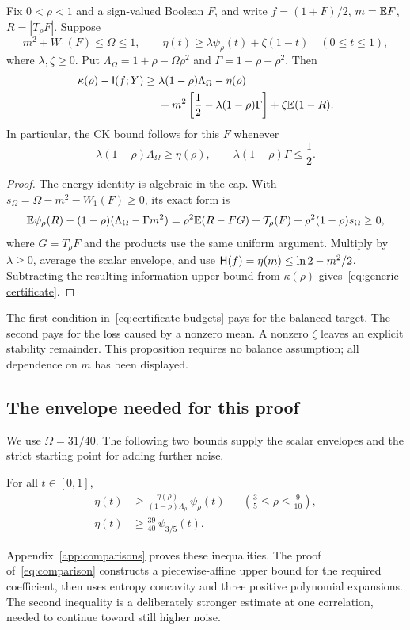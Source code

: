 \begin{proposition}\label{prop:certificate}
Fix $0<\rho<1$ and a sign-valued Boolean $F$, and write $f=(1+F)/2$, $m=\mathbb E F$, $R=|T_\rho F|$. Suppose
\[
 m^2+W_1(F)\le\Omega\le1,
 \qquad \eta(t)\ge\lambda\psi_\rho(t)+\zeta(1-t)
 \quad(0\le t\le1),
\]
where $\lambda,\zeta\ge0$. Put $\Lambda_\Omega=1+\rho-\Omega\rho^2$ and $\Gamma=1+\rho-\rho^2$. Then
\begin{align}\label{eq:generic-certificate}
 \kappa(\rho)-\mathsf I(f;Y)\ge{}&
 \lambda(1-\rho)\Lambda_\Omega-\eta(\rho)\notag\\
 &+m^2\left[\frac12-\lambda(1-\rho)\Gamma\right]
 +\zeta\mathbb E(1-R).
\end{align}
In particular, the CK bound follows for this $F$ whenever
\begin{equation}\label{eq:certificate-budgets}
 \lambda(1-\rho)\Lambda_\Omega\ge\eta(\rho),\qquad
 \lambda(1-\rho)\Gamma\le\frac12.
\end{equation}
\end{proposition}
\begin{proof}
The energy identity is algebraic in the cap. With $s_\Omega=\Omega-m^2-W_1(F)\ge0$, its exact form is
\[
 \mathbb E\psi_\rho(R)-(1-\rho)(\Lambda_\Omega-\Gamma m^2)
 =\rho^2\mathbb E(R-FG)+\mathcal T_\rho(F)+\rho^2(1-\rho)s_\Omega\ge0,
\]
where $G=T_\rho F$ and the products use the same uniform argument. Multiply by $\lambda\ge0$, average the scalar envelope, and use
$\mathsf H(f)=\eta(m)\le\ln2-m^2/2$.
Subtracting the resulting information upper bound from $\kappa(\rho)$ gives~\eqref{eq:generic-certificate}.
\end{proof}

The first condition in~\eqref{eq:certificate-budgets} pays for the balanced target. The second pays for the loss caused by a nonzero mean. A nonzero $\zeta$ leaves an explicit stability remainder. This proposition requires no balance assumption; all dependence on $m$ has been displayed.

\subsection{The envelope needed for this proof}
We use $\Omega=31/40$. The following two bounds supply the scalar envelopes and the strict starting point for adding further noise.

\begin{lemma}\label{lem:comparison}
For all $t\in[0,1]$,
\begin{align}
\eta(t)&\ge\frac{\eta(\rho)}{(1-\rho)\Lambda_\rho}\,\psi_\rho(t)
&&\left(\frac35\le\rho\le\frac9{10}\right),\label{eq:comparison}\\
\eta(t)&\ge\frac{39}{40}\,\psi_{3/5}(t).\label{eq:anchorcomparison}
\end{align}
\end{lemma}
Appendix~\ref{app:comparisons} proves these inequalities. The proof of~\eqref{eq:comparison} constructs a piecewise-affine upper bound for the required coefficient, then uses entropy concavity and three positive polynomial expansions. The second inequality is a deliberately stronger estimate at one correlation, needed to continue toward still higher noise.

